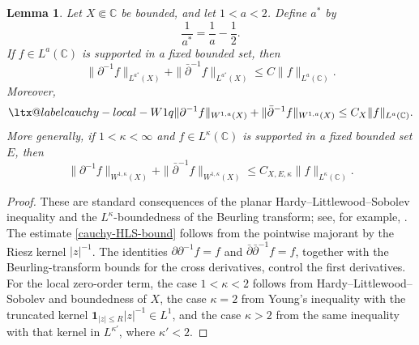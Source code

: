 \documentclass[a4paper,11pt]{article}
\makeatletter
\newcommand{\C}{\mathbb{C}}
\newcommand{\aliaslabel}[1]{\ltx@label{#1}}
\theoremstyle{plain}
\newtheorem{lem}[thm]{Lemma}
\theoremstyle{definition}
\theoremstyle{remark}
\makeatother
\begin{document}
\begin{lem}\label{lem-cauchy-basic}
Let $X\Subset\C$ be bounded, and let $1<a<2$.  Define $a^*$ by
\begin{equation*}
        \frac1{a^*}=\frac1a-\frac12 .
\end{equation*}
If $f\in L^a(\C)$ is supported in a fixed bounded set, then
\begin{equation}\label{cauchy-HLS-bound}
        \|\partial^{-1}f\|_{L^{a^*}(X)}+
        \|\bar\partial^{-1}f\|_{L^{a^*}(X)}
        \leq C\|f\|_{L^a(\C)}.
\end{equation}
Moreover,
\begin{equation}\label{cauchy-local-W1a}\aliaslabel{cauchy-local-W1q}
        \|\partial^{-1}f\|_{W^{1,a}(X)}+
        \|\bar\partial^{-1}f\|_{W^{1,a}(X)}
        \leq C_X\|f\|_{L^a(\C)}.
\end{equation}
More generally, if $1<\kappa<\infty$ and $f\in L^\kappa(\C)$ is supported in a fixed bounded set $E$, then
\begin{equation}\label{cauchy-local-W1s-all}
        \|\partial^{-1}f\|_{W^{1,\kappa}(X)}+
        \|\bar\partial^{-1}f\|_{W^{1,\kappa}(X)}
        \leq C_{X,E,\kappa}\|f\|_{L^\kappa(\C)}.
\end{equation}
\end{lem}

\begin{proof}
These are standard consequences of the planar Hardy--Littlewood--Sobolev inequality and the $L^\kappa$-boundedness of the Beurling transform; see, for example, \cite{AstalaIwaniecMartin2009}.  The estimate \eqref{cauchy-HLS-bound} follows from the pointwise majorant by the Riesz kernel $|z|^{-1}$.  The identities $\partial\partial^{-1}f=f$ and $\bar\partial\bar\partial^{-1}f=f$, together with the Beurling-transform bounds for the cross derivatives, control the first derivatives.  For the local zero-order term, the case $1<\kappa<2$ follows from Hardy--Littlewood--Sobolev and boundedness of $X$, the case $\kappa=2$ from Young's inequality with the truncated kernel $\mathbf 1_{|z|\le R}|z|^{-1}\in L^1$, and the case $\kappa>2$ from the same inequality with that kernel in $L^{\kappa'}$, where $\kappa'<2$.
\end{proof}
\end{document}
